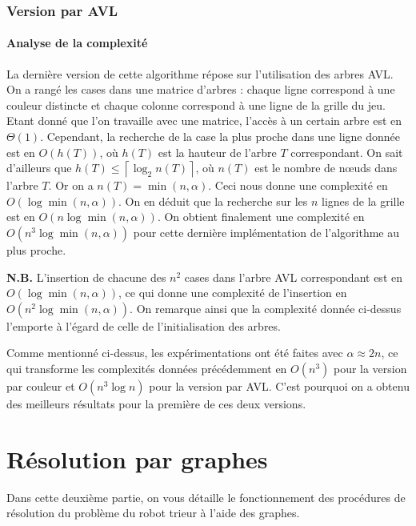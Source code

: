 \documentclass[12pt,a4paper]{article}
\begin{document}
\section{Version par AVL}
\subsection*{Analyse de la complexit\'e}
La derni\`ere version de cette algorithme r\'epose sur l'utilisation des 
arbres AVL. On a rang\'e les cases dans une matrice d'arbres : chaque ligne 
correspond \`a une couleur distincte et chaque colonne correspond \`a une ligne 
de la grille du jeu. Etant donn\'e que l'on travaille avec une matrice, 
l'acc\`es \`a un certain arbre est en $\Theta(1)$. Cependant, la recherche de 
la case la plus proche dans une ligne donn\'ee est en $O(h(T))$, o\`u $h(T)$ 
est la hauteur de l'arbre $T$ correspondant. On sait d'ailleurs que $h(T) \leq 
\left \lceil \log_2 n(T) \right \rceil$, o\`u $n(T)$ est le nombre de 
n\oe uds dans l'arbre $T$. Or on a $n(T) = \min(n,\alpha)$. 
Ceci nous donne une complexit\'e en $O(\log \min(n,\alpha))$. On en d\'eduit 
que la recherche sur les $n$ lignes de la grille est en $O(n\log 
\min(n,\alpha))$. On obtient finalement une complexit\'e en $O(n^3\log 
\min(n,\alpha))$ pour cette derni\`ere impl\'ementation de l'algorithme au plus 
proche.

{\bfseries N.B.} L'insertion de chacune des $n^2$ cases dans l'arbre 
AVL correspondant est en $O(\log \min(n,\alpha))$, ce qui donne une 
complexit\'e de l'insertion en $O(n^2\log \min(n,\alpha))$. On remarque ainsi 
que la complexit\'e donn\'ee ci-dessus l'emporte \`a l'\'egard de celle de 
l'initialisation des arbres. \par
Comme mentionn\'e ci-dessus, les exp\'erimentations ont \'et\'e faites avec 
$\alpha \approx 2n$, ce qui transforme les complexit\'es donn\'ees 
pr\'ec\'edemment en $O(n^3)$ pour la version par couleur et $O(n^3\log n)$ pour 
la version par AVL. C'est pourquoi on a obtenu des meilleurs r\'esultats pour 
la premi\`ere de ces deux versions.

\newpage

\part{R\'esolution par graphes}
Dans cette deuxi\`eme partie, on vous d\'etaille le fonctionnement des 
proc\'edures de r\'esolution du probl\`eme du robot trieur \`a l'aide des 
graphes.
\end{document}

